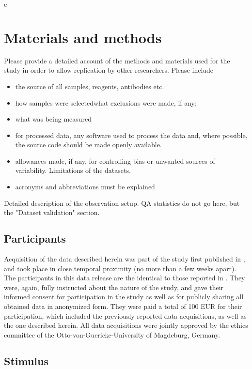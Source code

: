 c\section*{Materials and methods} 
Please provide a detailed account of the methods and materials used for the study in order to allow replication by other researchers.
Please include \begin{itemize}
\item 
the source of all samples, reagents, antibodies etc.
\item 
 how samples were selectedwhat exclusions were made, if any;
\item 
what was being measured
\item 
for processed data, any software used to process the data and, where possible, the source code should be made openly available.\item 

allowances made, if any, for controlling bias or unwanted sources of variability.
Limitations of the datasets.\item 

acronyms and abbreviations must be explained
\end{itemize}

Detailed description of the observation setup. QA statistics do not go here, but the "Dataset validation" section.

\subsection*{Participants}

Acquisition of the data described herein was part of the study first published
in \citet{Hanke_2014}, and took place in close temporal proximity (no more than
a few weeks apart). The participants in this data release are the identical to
those reported in \citet{Hanke_2014}.  They were, again, fully instructed about
the nature of the study, and gave their informed consent for participation in
the study as well as for publicly sharing all obtained data in anonymized form.
They were paid a total of 100 EUR for their participation, which included the
previously reported data acquisitions, as well as the one described herein. All
data acquisitions were jointly approved by the ethics committee of the
Otto-von-Guericke-University of Magdeburg, Germany.


\subsection*{Stimulus}

